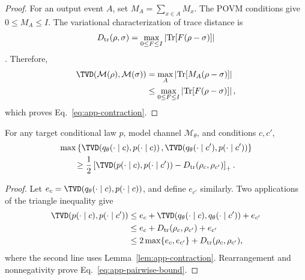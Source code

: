 \begin{proof}
For an output event $A$, set $M_A=\sum_{x\in A}M_x$. The POVM conditions give
$0\leq M_A\leq I$. The variational characterization of trace distance is
\begin{equation}
 D_{\rm tr}(\rho,\sigma)
 =\max_{0\leq F\leq I}
 \left|\operatorname{Tr}\!\left[F(\rho-\sigma)\right]\right|
 \label{eq:app-trace-variational}
\end{equation}
\cite{watrousTheoryQuantumInformation2018}. Therefore,
\begin{align}
 \TVD\!\left(\mathcal M(\rho),\mathcal M(\sigma)\right)
 &=\max_A
 \left|\operatorname{Tr}\!\left[M_A(\rho-\sigma)\right]\right|\\
 &\leq
 \max_{0\leq F\leq I}
 \left|\operatorname{Tr}\!\left[F(\rho-\sigma)\right]\right|,
\end{align}
which proves Eq.~\eqref{eq:app-contraction}.
\end{proof}

\begin{theorem}
\label{thm:app-pairwise}
For any target conditional law $p$, model channel $\mathcal M_\theta$, and
conditions $c,c'$,
\begin{multline}
 \max\left\{
 \TVD\!\left(q_\theta(\cdot\mid c),p(\cdot\mid c)\right),
 \TVD\!\left(q_\theta(\cdot\mid c'),p(\cdot\mid c')\right)
 \right\}\\
 \geq\frac12\left[
 \TVD\!\left(p(\cdot\mid c),p(\cdot\mid c')\right)
 -D_{\rm tr}(\rho_c,\rho_{c'})
 \right]_+.
 \label{eq:app-pairwise-bound}
\end{multline}
\end{theorem}

\begin{proof}
Let
$e_c=\TVD(q_\theta(\cdot\mid c),p(\cdot\mid c))$, and define $e_{c'}$
similarly. Two applications of the triangle inequality give
\begin{align}
 \TVD\!\left(p(\cdot\mid c),p(\cdot\mid c')\right)
 &\leq e_c+
 \TVD\!\left(q_\theta(\cdot\mid c),
 q_\theta(\cdot\mid c')\right)+e_{c'}\\
 &\leq e_c+D_{\rm tr}(\rho_c,\rho_{c'})+e_{c'}\\
 &\leq2\max\{e_c,e_{c'}\}+D_{\rm tr}(\rho_c,\rho_{c'}),
\end{align}
where the second line uses Lemma~\ref{lem:app-contraction}. Rearrangement and
nonnegativity prove Eq.~\eqref{eq:app-pairwise-bound}.
\end{proof}

